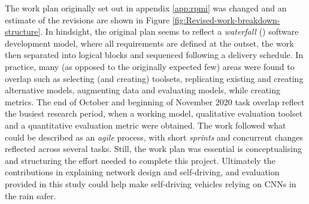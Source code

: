 The work plan originally set out in appendix \ref{app:rpmi} was changed and an estimate of the revisions are shown in Figure \ref{fig:Revised-work-breakdown-structure}. In hindsight, the original plan seems to reflect a \textit{waterfall} (\cite{balaji2012waterfall}) software development model, where all requirements are defined at the outset, the work then separated into logical blocks and sequenced following a delivery schedule. In practice, many (as opposed to the originally expected few) areas were found to overlap such as selecting (and creating) toolsets, replicating existing and creating alternative models, augmenting data and evaluating models, while creating metrics. The end of October and beginning of November 2020 task overlap reflect the busiest research period, when a working model, qualitative evaluation toolset and a quantitative evaluation metric were obtained. The work followed what could be described as an \textit{agile} process, with short \textit{sprints} and concurrent changes reflected across several tasks. Still, the work plan was essential is conceptualising and structuring the effort needed to complete this project.
Ultimately the contributions in explaining network design and self-driving, and evaluation provided in this study could help make self-driving vehicles relying on CNNs in the rain safer. 









